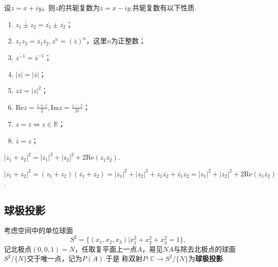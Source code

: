 \documentclass[openany,oneside]{ctexbook}
\begin{document}
设$z = x + iy$，则$z$的共轭复数为$\overline{z} = x - iy$.共轭复数有以下性质.
\begin{enumerate}[label=(\arabic*), itemsep=1pt]
    \item $\overline{z_1 \pm z_2} = \overline{z_1} \pm \overline{z_2}$；
    \item $z_1 z_2 = \overline{z_1} \overline{z_2}, z^n = (\overline{z})^n$，这里$n$为正整数；
    \item $\overline{z^{-1}} = \overline{z}^{-1}$；
    \item $|z| = |\overline{z}|$；
    \item $z\overline{z} = |z|^2$；
    \item $\mathrm{Re} z = \frac{z + \overline{z}}{2}, \mathrm{Im} z = \frac{z - \overline{z}}{2i}$；
    \item $z = \overline{z} \iff z \in \mathbb{R}$；
    \item $\overline{\overline{z}} = z$；
\end{enumerate}
\begin{example}
    $|z_1 + z_2|^2 = |z_1|^2 + |z_2|^2 + 2\mathrm{Re}(z_1 \overline{z_2})$.
\end{example}
\begin{solution}
    $|z_1 + z_2|^2 = (z_1 + z_2)(\overline{z_1} + \overline{z_2}) = |z_1|^2 + |z_2|^2 + z_1 \overline{z_2} + \overline{z_1} z_2 = |z_1|^2 + |z_2|^2 + 2\mathrm{Re}(z_1 \overline{z_2})$.
\end{solution}

\subsection{球极投影}

考虑空间中的单位球面
\[
S^2 = \{(x_1, x_2, x_3)|x_1^2 + x_2^2+x_3^2=1\},
\]
记北极点$(0, 0, 1) = N$，任取复平面上一点$A$，易见$NA$与除去北极点的球面$S^2/\{N\}$交于唯一点，记为$P(A)$.于是
称双射$P:\mathbb{C} \rightarrow S^2/\{N\}$为\textbf{球极投影}.
\end{document}
